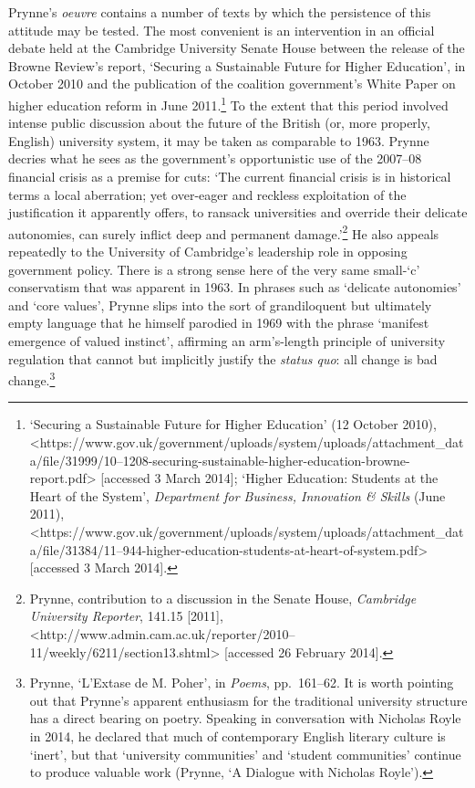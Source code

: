 \documentclass[]{article}
\begin{document}
Prynne’s \emph{oeuvre} contains a number of texts by which the
persistence of this attitude may be tested. The most convenient is an
intervention in an official debate held at the Cambridge University
Senate House between the release of the Browne Review’s report,
‘Securing a Sustainable Future for Higher Education’, in October 2010
and the publication of the coalition government’s White Paper on higher
education reform in June 2011.\footnote{‘Securing a Sustainable Future
  for Higher Education’ (12 October 2010),
  \textless{}https://www.gov.uk\slash government\slash uploads\slash system\slash uploads\slash attachment\_data\slash file\slash 31999\slash 10–1208-securing-sustainable-higher-education-browne-report.pdf\textgreater{}
  {[}accessed 3 March 2014{]}; ‘Higher Education: Students at the Heart
  of the System’, \emph{Department for Business, Innovation \& Skills}
  (June 2011),
  \textless{}https://www.gov.uk\slash government\slash uploads\slash system\slash uploads\slash attachment\_data\slash file\slash 31384/11–944-higher-education-students-at-heart-of-system.pdf\textgreater{}
  {[}accessed 3 March 2014{]}.} To the extent that this period involved
intense public discussion about the future of the British (or, more
properly, English) university system, it may be taken as comparable to
1963. Prynne decries what he sees as the government’s opportunistic use
of the 2007–08 financial crisis as a premise for cuts: ‘The current
financial crisis is in historical terms a local aberration; yet
over-eager and reckless exploitation of the justification it apparently
offers, to ransack universities and override their delicate autonomies,
can surely inflict deep and permanent damage.’\footnote{Prynne,
  contribution to a discussion in the Senate House, \emph{Cambridge
  University Reporter}, 141.15 {[}2011{]},
  \textless{}http://www.admin.cam.ac.uk/reporter/2010–11/weekly/6211/section13.shtml\textgreater{}
  {[}accessed 26 February 2014{]}.} He also appeals repeatedly to the
University of Cambridge’s leadership role in opposing government policy.
There is a strong sense here of the very same small-‘c’ conservatism
that was apparent in 1963. In phrases such as ‘delicate autonomies’ and
‘core values’, Prynne slips into the sort of grandiloquent but
ultimately empty language that he himself parodied in 1969 with the
phrase ‘manifest emergence \textbar{} of valued instinct’, affirming an
arm’s-length principle of university regulation that cannot but
implicitly justify the \emph{status quo}: all change is bad
change.\footnote{Prynne, ‘L’Extase de M. Poher’, in \emph{Poems},
  pp.~161–62. It is worth pointing out that Prynne’s apparent enthusiasm
  for the traditional university structure has a direct bearing on
  poetry. Speaking in conversation with Nicholas Royle in 2014, he
  declared that much of contemporary English literary culture is
  ‘inert’, but that ‘university communities’ and ‘student communities’
  continue to produce valuable work (Prynne, ‘A Dialogue with Nicholas
  Royle’).}
\end{document}
